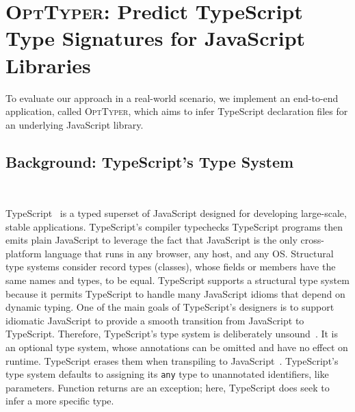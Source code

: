 \documentclass[sigplan,10pt,review,anonymous]{acmart} %
\newcommand{\projectname}{\textsc{OptTyper}\xspace}
\theoremstyle{plain}
\theoremstyle{remark}
\theoremstyle{definition}
\begin{document}




\section{\projectname: Predict TypeScript Type Signatures for JavaScript Libraries}
\label{sec:prodts}
To evaluate our approach in a real-world scenario, we
implement an end-to-end application, called \projectname, which aims
to infer TypeScript declaration files
for an underlying JavaScript library.

\subsection{Background: TypeScript's Type System}~\label{ssec:intro-typescript}

TypeScript~\citep{typescript} is a typed superset of
JavaScript designed for developing large-scale, stable applications.
TypeScript's compiler typechecks TypeScript programs then emits plain JavaScript
to leverage the fact that JavaScript is the only cross-platform
language that runs in any browser, any host, and any OS.
Structural type systems consider record types (classes), whose fields or members have the same names and types, to be equal.
TypeScript supports a
structural type system because it permits TypeScript to handle many JavaScript idioms that depend on dynamic typing.
One of the main goals of TypeScript's designers is to support idiomatic
JavaScript to
provide a smooth transition from JavaScript to TypeScript.
%
Therefore, TypeScript's type system is deliberately
unsound~\citep{understandtypescript}.  It is an optional type system, whose
annotations can be omitted and have no effect on runtime.  TypeScript erases 
them when transpiling to JavaScript~\citep{understandtypescript}.
TypeScript's type system defaults to assigning its \texttt{any} type to
unannotated identifiers, like parameters.  Function returns are an exception;
here, TypeScript does seek to infer a more specific type.
\end{document}
